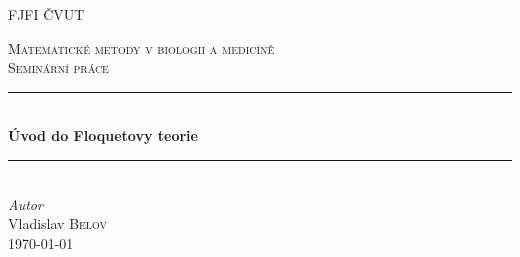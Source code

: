\pagestyle{empty}

\begin{titlepage} %
	\newcommand{\HRule}{\rule{\linewidth}{0.5mm}} %
	\center %
	
	\textsc{\LARGE FJFI ČVUT}\\[1.5cm] %
	\vfill
	
	\textsc{\Large Matematické metody v biologii a medicíně}\\[0.5cm] %
	\textsc{\large Seminární práce}\\[0.5cm] %
	\HRule\\[0.4cm]
	{\huge\bfseries Úvod do Floquetovy teorie}\\[0.4cm] %
	\HRule\\[1.5cm]
	{\large\textit{Autor}}\\
	Vladislav \textsc{Belov}\\
	\vfill\vfill\vfill\vfill\vfill\vfill\vfill %
	{\large\today} %
	
	\vfill %
	
\end{titlepage}

